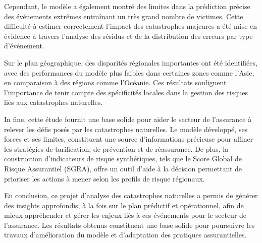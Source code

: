 \documentclass[
]{article}
\begin{document}
Cependant, le modèle a également montré des limites dans la prédiction
précise des événements extrêmes entraînant un très grand nombre de
victimes. Cette difficulté à estimer correctement l'impact des
catastrophes majeures a été mise en évidence à travers l'analyse des
résidus et de la distribution des erreurs par type d'événement.

Sur le plan géographique, des disparités régionales importantes ont été
identifiées, avec des performances du modèle plus faibles dans certaines
zones comme l'Asie, en comparaison à des régions comme l'Océanie. Ces
résultats soulignent l'importance de tenir compte des spécificités
locales dans la gestion des risques liés aux catastrophes naturelles.

In fine, cette étude fournit une base solide pour aider le secteur de
l'assurance à relever les défis posés par les catastrophes naturelles.
Le modèle développé, ses forces et ses limites, constituent une source
d'informations précieuse pour affiner les stratégies de tarification, de
prévention et de réassurance. De plus, la construction d'indicateurs de
risque synthétiques, tels que le Score Global de Risque Assurantiel
(SGRA), offre un outil d'aide à la décision permettant de prioriser les
actions à mener selon les profils de risque régionaux.

En conclusion, ce projet d'analyse des catastrophes naturelles a permis
de générer des insights approfondis, à la fois sur le plan prédictif et
opérationnel, afin de mieux appréhender et gérer les enjeux liés à ces
événements pour le secteur de l'assurance. Les résultats obtenus
constituent une base solide pour poursuivre les travaux d'amélioration
du modèle et d'adaptation des pratiques assurantielles.
\end{document}
